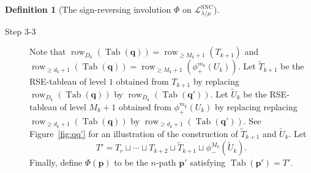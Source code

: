 \documentclass{amsart}
\numberwithin{equation}{section}
\theoremstyle{definition}
\newtheorem{defn}[thm]{Definition}
\newcommand\Tab{\operatorname{Tab}}
\newcommand\LL{\mathcal{L}_\lm}
\newcommand\lsnc{\LL^{\operatorname{SNC}}}
\newcommand\row{\operatorname{row}}
\newcommand\pd{\phi_+}
\newcommand\pu{\phi_-}
\newcommand\pp{\mathbf{p}}
\newcommand\lm{{\lambda/\mu}}
\begin{document}
\begin{defn}[The sign-reversing involution $\Phi$ on $\lsnc$]
\begin{description}
\begin{description}
\item[Step 3-3] Note that $\row_{D_k}(\Tab(\mathbf{q}))=\row_{\ge
    M_k+1}(T_{k+1})$ and $\row_{\ge d_k+1}(\Tab(\mathbf{q}))=\row_{\ge
    M_k+1}(\pd^{m_k}(U_{k}))$. Let $\widetilde{T}_{k+1}$ be the RSE-tableau of
  level $1$ obtained from $T_{k+1}$ by replacing $\row_{D_k}(\Tab(\mathbf{q}))$
  by $\row_{D_k}(\Tab(\mathbf{q'}))$. Let $\widetilde{U}_{k}$ be the RSE-tableau
  of level $M_k+1$ obtained from $\pd^{m_k}(U_k)$ by replacing replacing
  $\row_{\ge d_k+1}(\Tab(\mathbf{q}))$ by $\row_{\ge d_k+1}(\Tab(\mathbf{q'}))$.
  See Figure~\ref{fig:qq'} for an illustration of the construction of
  $\widetilde{T}_{k+1}$ and $\widetilde{U}_{k}$. Let
  \[
    T'=T_r\sqcup \cdots \sqcup T_{k+2}\sqcup \widetilde{T}_{k+1}\sqcup
    \pu^{M_k}(\widetilde{U}_{k}).
  \]
  Finally, define $\Phi(\pp)$ to be the $n$-path $\pp'$ satisfying
  $\Tab(\pp') = T'$. 
    \end{description}
  \end{description}
\end{defn}
\end{document}
